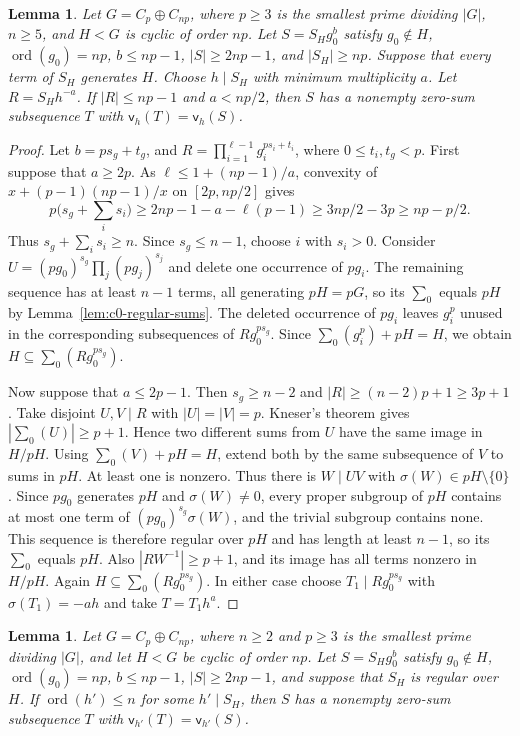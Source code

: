 \documentclass[10pt,reqno]{amsart}
\newtheorem{lem}[thm]{Lemma}
\theoremstyle{definition}
\theoremstyle{remark}
\numberwithin{equation}{section}
\DeclareMathOperator{\ord}{ord}
\begin{document}
\begin{lem}\label{lem:N-index-p-generators}
Let $G=C_p\oplus C_{np}$, where $p\ge3$ is the smallest prime
dividing $|G|$, $n\ge5$, and $H<G$ is cyclic of order $np$.
Let $S=S_Hg_0^b$ satisfy $g_0\notin H$, $\ord(g_0)=np$,
$b\le np-1$, $|S|\ge2np-1$, and $|S_H|\ge np$.
Suppose that every term of $S_H$ generates $H$.
Choose $h\mid S_H$ with minimum multiplicity $a$.
Let $R=S_Hh^{-a}$. If $|R|\le np-1$ and $a<np/2$,
then $S$ has a nonempty zero-sum subsequence $T$ with $\mathsf v_h(T)=\mathsf v_h(S)$.
\end{lem}

\begin{proof}
Let $b=ps_g+t_g$, and
$R=\prod_{i=1}^{\ell-1}g_i^{ps_i+t_i}$, where $0\le t_i,t_g<p$.
First suppose that $a\ge2p$.
As $\ell\le1+(np-1)/a$, convexity of
$x+(p-1)(np-1)/x$ on $[2p,np/2]$ gives
\[
p\Big(s_g+\sum_i s_i\Big)
\ge2np-1-a-\ell(p-1)
\ge3np/2-3p\ge np-p/2.
\]
Thus $s_g+\sum_i s_i\ge n$.
Since $s_g\le n-1$, choose $i$ with $s_i>0$.
Consider $U=(pg_0)^{s_g}\prod_j(pg_j)^{s_j}$ and delete one
occurrence of $pg_i$.
The remaining sequence has at least $n-1$ terms, all generating
$pH=pG$, so its $\sum_0$ equals $pH$ by
Lemma~\ref{lem:c0-regular-sums}.
The deleted occurrence of $pg_i$ leaves $g_i^p$ unused in the corresponding
subsequences of $Rg_0^{ps_g}$. Since $\sum_0(g_i^p)+pH=H$, we obtain
$H\subseteq\sum_0(Rg_0^{ps_g})$.

Now suppose that $a\le2p-1$.
Then $s_g\ge n-2$ and $|R|\ge(n-2)p+1\ge3p+1$.
Take disjoint $U,V\mid R$ with $|U|=|V|=p$.
Kneser's theorem gives $|\sum_0(U)|\ge p+1$.
Hence two different sums from $U$ have the same image in $H/pH$.
Using $\sum_0(V)+pH=H$, extend both by the same subsequence of $V$
to sums in $pH$. At least one is nonzero.
Thus there is $W\mid UV$ with $\sigma(W)\in pH\setminus\{0\}$.
Since $pg_0$ generates $pH$ and $\sigma(W)\ne0$, every proper
subgroup of $pH$ contains at most one term of $(pg_0)^{s_g}\sigma(W)$,
and the trivial subgroup contains none. This sequence is therefore regular
over $pH$ and has length at least $n-1$, so its $\sum_0$ equals $pH$.
Also $|RW^{-1}|\ge p+1$, and its image has all terms nonzero in $H/pH$.
Again $H\subseteq\sum_0(Rg_0^{ps_g})$.
In either case choose $T_1\mid Rg_0^{ps_g}$ with
$\sigma(T_1)=-ah$ and take $T=T_1h^a$.
\end{proof}

\begin{lem}\label{lem:N-index-p-low-order}
Let $G=C_p\oplus C_{np}$, where $n\ge2$ and $p\ge3$ is the
smallest prime dividing $|G|$, and let $H<G$ be cyclic of order $np$.
Let $S=S_Hg_0^b$ satisfy $g_0\notin H$, $\ord(g_0)=np$,
$b\le np-1$, $|S|\ge2np-1$, and suppose that $S_H$ is regular over $H$.
If $\ord(h')\le n$ for some $h'\mid S_H$, then $S$ has a nonempty zero-sum
subsequence $T$ with $\mathsf v_{h'}(T)=\mathsf v_{h'}(S)$.
\end{lem}
\end{document}
